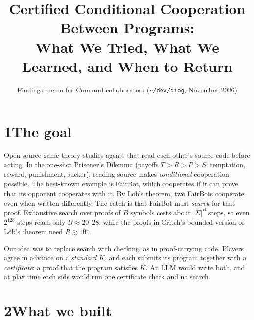 \documentclass[11pt]{article}
\title{\vspace{-1.5em}Certified Conditional Cooperation Between Programs:\\ What We Tried, What We Learned, and When to Return}
\author{Findings memo for Cam and collaborators \quad (\texttt{\~{}/dev/diag}, November 2026)}
\date{\vspace{-2.5em}}
\begin{document}
\maketitle

\begin{center}
\end{center}

\section*{1\quad The goal}

Open-source game theory studies agents that read each other's source code before acting. In the one-shot Prisoner's Dilemma (payoffs $T > R > P > S$: temptation, reward, punishment, sucker), reading source makes \emph{conditional} cooperation possible. The best-known example is FairBot, which cooperates if it can prove that its opponent cooperates with it. By Löb's theorem, two FairBots cooperate even when written differently. The catch is that FairBot must \emph{search} for that proof. Exhaustive search over proofs of $B$ symbols costs about $|\Sigma|^B$ steps, so even $2^{128}$ steps reach only $B \approx 20$--$28$, while the proofs in Critch's bounded version of Löb's theorem need $B \gtrsim 10^4$.

Our idea was to replace search with checking, as in proof-carrying code. Players agree in advance on a \emph{standard} $K$, and each submits its program together with a \emph{certificate}: a proof that the program satisfies $K$. An LLM would write both, and at play time each side would run one certificate check and no search.

\section*{2\quad What we built}
\end{document}
